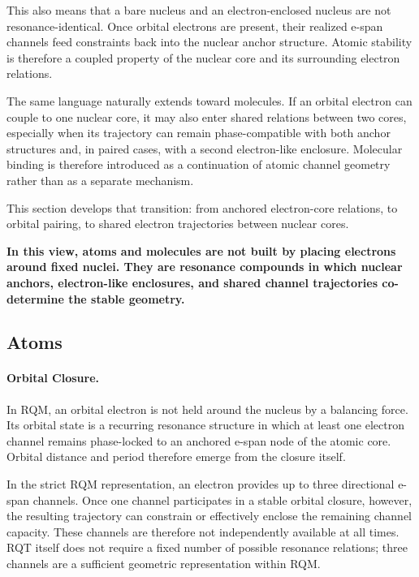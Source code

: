 \documentclass[11pt,a4paper]{article}
\begin{document}
This also means that a bare nucleus and an electron-enclosed nucleus are not resonance-identical. Once orbital electrons are present, their realized e-span channels feed constraints back into the nuclear anchor structure. Atomic stability is therefore a coupled property of the nuclear core and its surrounding electron relations.

The same language naturally extends toward molecules. If an orbital electron can couple to one nuclear core, it may also enter shared relations between two cores, especially when its trajectory can remain phase-compatible with both anchor structures and, in paired cases, with a second electron-like enclosure. Molecular binding is therefore introduced as a continuation of atomic channel geometry rather than as a separate mechanism.

This section develops that transition: from anchored electron-core relations, to orbital pairing, to shared electron trajectories between nuclear cores.

\textbf{In this view, atoms and molecules are not built by placing electrons around fixed nuclei. They are resonance compounds in which nuclear anchors, electron-like enclosures, and shared channel trajectories co-determine the stable geometry.}

\subsection{Atoms}

%

\paragraph{Orbital Closure.}
In RQM, an orbital electron is not held around the nucleus by a balancing force. Its orbital state is a recurring resonance structure in which at least one electron channel remains phase-locked to an anchored e-span node of the atomic core. Orbital distance and period therefore emerge from the closure itself.

In the strict RQM representation, an electron provides up to three directional e-span channels. Once one channel participates in a stable orbital closure, however, the resulting trajectory can constrain or effectively enclose the remaining channel capacity. These channels are therefore not independently available at all times. RQT itself does not require a fixed number of possible resonance relations; three channels are a sufficient geometric representation within RQM.
\end{document}
